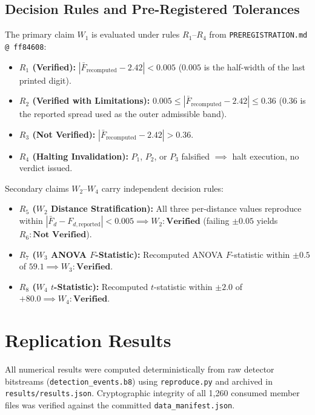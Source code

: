\subsection{Decision Rules and Pre-Registered Tolerances}
The primary claim $W_1$ is evaluated under rules $R_1$–$R_4$ from \texttt{PREREGISTRATION.md @ ff84608}:
\begin{itemize}
    \item \textbf{$R_1$ (Verified):} $|\bar{F}_{\text{recomputed}} - 2.42| < 0.005$ ($0.005$ is the half-width of the last printed digit).
    \item \textbf{$R_2$ (Verified with Limitations):} $0.005 \le |\bar{F}_{\text{recomputed}} - 2.42| \le 0.36$ ($0.36$ is the reported spread used as the outer admissible band).
    \item \textbf{$R_3$ (Not Verified):} $|\bar{F}_{\text{recomputed}} - 2.42| > 0.36$.
    \item \textbf{$R_4$ (Halting Invalidation):} $P_1$, $P_2$, or $P_3$ falsified $\implies$ halt execution, no verdict issued.
\end{itemize}
Secondary claims $W_2$–$W_4$ carry independent decision rules:
\begin{itemize}
    \item \textbf{$R_5$ ($W_2$ Distance Stratification):} All three per-distance values reproduce within $|\bar{F}_{d} - F_{d,\text{reported}}| < 0.005 \implies W_2: \textbf{Verified}$ (failing $\pm 0.05$ yields $R_6: \textbf{Not Verified}$).
    \item \textbf{$R_7$ ($W_3$ ANOVA $F$-Statistic):} Recomputed ANOVA $F$-statistic within $\pm 0.5$ of $59.1 \implies W_3: \textbf{Verified}$.
    \item \textbf{$R_8$ ($W_4$ $t$-Statistic):} Recomputed $t$-statistic within $\pm 2.0$ of $+80.0 \implies W_4: \textbf{Verified}$.
\end{itemize}

\section{Replication Results}

All numerical results were computed deterministically from raw detector bitstreams (\texttt{detection\_events.b8}) using \texttt{reproduce.py} and archived in \texttt{results/results.json}. Cryptographic integrity of all 1,260 consumed member files was verified against the committed \texttt{data\_manifest.json}.

